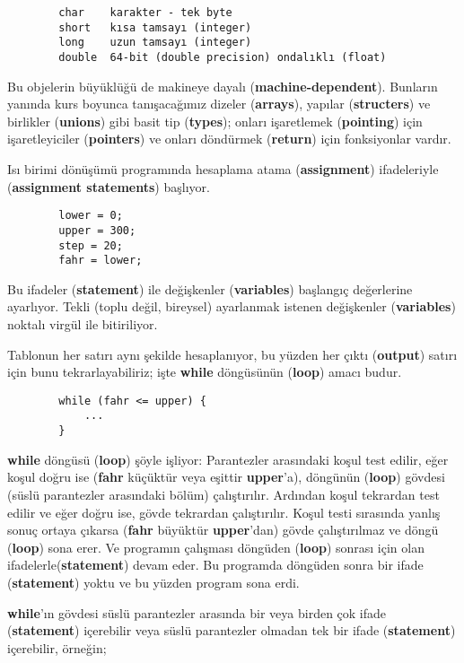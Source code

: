 \documentclass[a4paper,12pt,oneside]{book}
\begin{document}
\begin{lstlisting}
        char    karakter - tek byte
        short   kısa tamsayı (integer)
        long    uzun tamsayı (integer)
        double  64-bit (double precision) ondalıklı (float)
\end{lstlisting}
Bu objelerin büyüklüğü de makineye dayalı (\textbf{machine-dependent}). Bunların yanında kurs boyunca tanışacağımız dizeler (\textbf{arrays}), yapılar (\textbf{structers}) ve birlikler (\textbf{unions}) gibi basit tip (\textbf{types}); onları işaretlemek (\textbf{pointing}) için işaretleyiciler (\textbf{pointers}) ve onları döndürmek (\textbf{return}) için fonksiyonlar  vardır. \pagebreak
\par Isı birimi dönüşümü programında hesaplama atama (\textbf{assignment}) ifadeleriyle (\textbf{assignment statements}) başlıyor.
\begin{lstlisting}
        lower = 0;
        upper = 300;
        step = 20;
        fahr = lower;
\end{lstlisting}
Bu ifadeler (\textbf{statement}) ile değişkenler (\textbf{variables}) başlangıç değerlerine ayarlıyor. Tekli (toplu değil, bireysel) ayarlanmak istenen değişkenler (\textbf{variables}) noktalı virgül ile bitiriliyor.
\par Tablonun her satırı aynı şekilde hesaplanıyor, bu yüzden her çıktı (\textbf{output}) satırı için bunu tekrarlayabiliriz; işte \textbf{while} döngüsünün (\textbf{loop}) amacı budur.
\begin{lstlisting}
        while (fahr <= upper) {
            ...
        }
\end{lstlisting}
\textbf{while} döngüsü (\textbf{loop}) şöyle işliyor: Parantezler arasındaki koşul test edilir, eğer koşul doğru ise (\textbf{fahr} küçüktür veya eşittir \textbf{upper}'a), döngünün (\textbf{loop}) gövdesi (süslü parantezler arasındaki bölüm) çalıştırılır. Ardından koşul tekrardan test edilir ve eğer doğru ise, gövde tekrardan çalıştırılır. Koşul testi sırasında yanlış sonuç ortaya çıkarsa (\textbf{fahr} büyüktür \textbf{upper}'dan) gövde çalıştırılmaz ve döngü (\textbf{loop}) sona erer. Ve programın çalışması döngüden (\textbf{loop}) sonrası için olan ifadelerle(\textbf{statement}) devam eder. Bu programda döngüden sonra bir ifade (\textbf{statement}) yoktu ve bu yüzden program sona erdi.
\par \textbf{while}'ın gövdesi süslü parantezler arasında bir veya birden çok ifade (\textbf{statement}) içerebilir veya süslü parantezler olmadan tek bir ifade (\textbf{statement}) içerebilir, örneğin;
\end{document}
